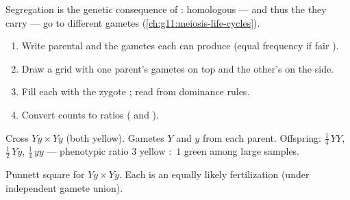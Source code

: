 \begin{remark}
Segregation is the genetic consequence of : homologous  ---
and thus the  they carry --- go to different gametes
(\cref{ch:g11:meiosis-life-cycles}).
\end{remark}

\begin{method}\label{met:g11:mendelian-genetics:mono}
\begin{enumerate}
  \item Write parental  and the gametes each can produce (equal
        frequency if fair ).
  \item Draw a grid with one parent's gametes on top and the other's on the side.
  \item Fill each  with the zygote ; read  from dominance
        rules.
  \item Convert counts to ratios ( and ).
\end{enumerate}
\end{method}

\begin{example}\label{ex:g11:mendelian-genetics:mono}
Cross $Yy \times Yy$ (both yellow). Gametes $Y$ and $y$ from each parent.
Offspring: $\tfrac14\,YY$, $\tfrac12\,Yy$, $\tfrac14\,yy$ --- phenotypic ratio
$3$ yellow $:$ $1$ green among large samples.
\end{example}

\begin{omfigure}

{\small Punnett square for $Yy \times Yy$. Each  is an equally likely
fertilization (under independent gamete union).}
\end{omfigure}

